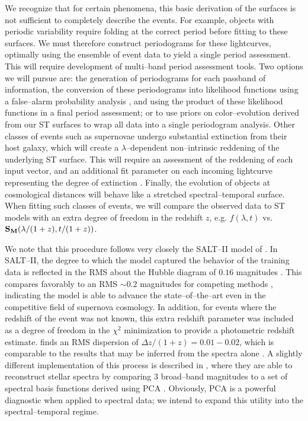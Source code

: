  We recognize that for certain
phenomena, this basic derivation of the surfaces is not sufficient to completely
describe the events. For example, objects with periodic variability require
folding at the correct period before fitting to these surfaces.  We must
therefore construct periodograms for these lightcurves, optimally using the
ensemble of event data to yield a single period assessment.  This will require
development of multi--band period assessment tools.  Two options we will pursue
are: the generation of periodograms for each passband of information, the
conversion of these periodograms into likelihood functions using a false--alarm
probability analysis \citep[e.g.][and references therein]{2009A&A...496..577Z},
and using the product of these likelihood functions in a final period
assessment; or to use priors on color--evolution derived from our ST surfaces to
wrap all data into a single periodogram analysis.  Other classes of events such
as supernovae undergo substantial extinction from their host galaxy, which will
create a $\lambda$--dependent non--intrinsic reddening of the underlying ST
surface. This will require an assessment of the reddening of each input vector,
and an additional fit parameter on each incoming lightcurve representing the
degree of extinction \cite[e.g. Equation 1,][]{2007A&A...466...11G}.  Finally,
the evolution of objects at cosmological distances will behave like a stretched
spectral--temporal surface.  When fitting such classes of events, we will
compare the observed data to ST models with an extra degree of freedom in the
redshift $z$, e.g. $f(\lambda, t)$ vs. ${\bf S_M}(\lambda/(1+z), t/(1+z))$.

 We note that this procedure follows very closely
the SALT--II model of \cite{2007A&A...466...11G}.  In SALT--II, the degree to
which the model captured the behavior of the training data is reflected in the
RMS about the Hubble diagram of $0.16$ magnitudes \citep{2007A&A...466...11G}.
This compares favorably to an RMS $\sim 0.2$ magnitudes for competing methods
\citep{2009ApJS..185...32K}, indicating the model is able to advance the
state--of--the--art even in the competitive field of supernova cosmology. In
addition, for events where the redshift of the event was not known, this extra
redshift parameter was included as a degree of freedom in the $\chi^2$
minimization to provide a photometric redshift estimate.
\cite{2007A&A...466...11G} finds an RMS dispersion of $\Delta z/(1 + z) =
0.01-0.02$, which is comparable to the results that may be inferred from the
spectra alone \citep[see also][]{2010ApJ...717...40K}.  A slightly different
implementation of this process is described in \cite{2010ApJ...719.1759A}, where
they are able to reconstruct stellar spectra by comparing 3 broad--band
magnitudes to a set of spectral basis functions derived using PCA
\citep{2010AJ....139.1261M}.  Obviously, PCA is a powerful diagnostic when
applied to spectral data; we intend to expand this utility into the
spectral--temporal regime.

